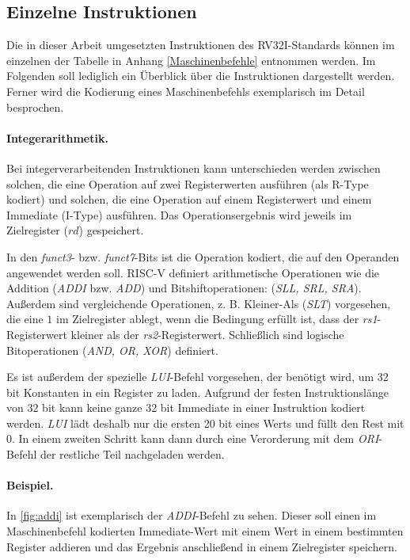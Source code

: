 \subsection{Einzelne Instruktionen}
Die in dieser Arbeit umgesetzten Instruktionen des RV32I-Standards können im einzelnen der Tabelle in Anhang \ref{Maschinenbefehle} entnommen werden. Im Folgenden soll lediglich ein Überblick über die Instruktionen dargestellt werden. Ferner wird die Kodierung eines Maschinenbefehls exemplarisch im Detail besprochen.

\paragraph{Integerarithmetik.}
Bei integerverarbeitenden Instruktionen kann unterschieden werden zwischen solchen, die eine Operation auf zwei Registerwerten ausführen (als R-Type kodiert) und solchen, die eine Operation auf einem Registerwert und einem Immediate (I-Type) ausführen. Das Operationsergebnis wird jeweils im Zielregister ($rd$) gespeichert.

In den \emph{funct3}- bzw. \emph{funct7}-Bits ist die Operation kodiert, die auf den Operanden angewendet werden soll. RISC-V definiert arithmetische Operationen wie die Addition (\emph{ADDI} bzw. \emph{ADD}) und Bitshiftoperationen: (\textit{SLL, SRL, SRA}). Außerdem sind vergleichende Operationen, z. B. Kleiner-Als (\textit{SLT}) vorgesehen, die eine $1$ im Zielregister ablegt, wenn die Bedingung erfüllt ist, dass der \emph{rs1}-Registerwert kleiner als der \emph{rs2}-Registerwert. Schließlich sind logische Bitoperationen (\textit{AND, OR, XOR}) definiert.

Es ist außerdem der spezielle \textit{LUI}-Befehl vorgesehen, der benötigt wird, um 32 bit Konstanten in ein Register zu laden. Aufgrund der festen Instruktionslänge von 32 bit kann keine ganze 32 bit Immediate in einer Instruktion kodiert werden. \textit{LUI} lädt deshalb nur die ersten 20 bit eines Werts und füllt den Rest mit $0$. In einem zweiten Schritt kann dann durch eine Verorderung mit dem \textit{ORI}-Befehl der restliche Teil nachgeladen werden.

\paragraph{Beispiel.} In \ref{fig:addi} ist exemplarisch der \textit{ADDI}-Befehl zu sehen. Dieser soll einen im Maschinenbefehl kodierten Immediate-Wert mit einem Wert in einem bestimmten Register addieren und das Ergebnis anschließend in einem Zielregister speichern.
 
